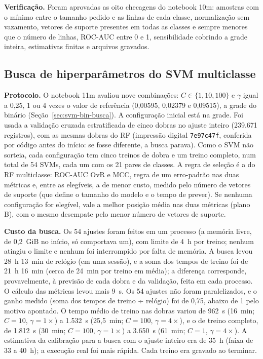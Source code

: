 \documentclass[
    12pt,                %
    openright,           %
    oneside,             %
    a4paper,             %
    english,             %
    brazil               %
]{abntex2}
\begin{document}
\textbf{Verificação.} Foram aprovadas as oito checagens do notebook 10m: amostras com o mínimo entre o tamanho pedido e as linhas de cada classe, normalização sem vazamento, vetores de suporte presentes em todas as classes e sempre menores que o número de linhas, ROC-AUC entre 0 e 1, sensibilidade cobrindo a grade inteira, estimativas finitas e arquivos gravados.
 
 
\subsection{Busca de hiperparâmetros do SVM multiclasse}
\label{sec:svm-multi-busca}
 
\textbf{Protocolo.} O notebook 11m avaliou nove combinações: $C \in \{1, 10, 100\}$ e $\gamma$ igual a 0,25, 1 ou 4 vezes o valor de referência (0,00595, 0,02379 e 0,09515), a grade do binário (Seção~\ref{sec:svm-bin-busca}). A configuração inicial está na grade. Foi usada a validação cruzada estratificada de cinco dobras no ajuste inteiro (239.671 registros), com as mesmas dobras do RF (impressão digital \texttt{7e97c47f}, conferida por código antes do início: se fosse diferente, a busca parava). Como o SVM não sorteia, cada configuração tem cinco treinos de dobra e um treino completo, num total de 54 SVMs, cada um com os 21 pares de classes. A regra de seleção é a do RF multiclasse: ROC-AUC OvR e MCC, regra de um erro-padrão nas duas métricas e, entre as elegíveis, a de menor custo, medido pelo número de vetores de suporte (que define o tamanho do modelo e o tempo de prever). Se nenhuma configuração for elegível, vale a melhor posição média nas duas métricas (plano B), com o mesmo desempate pelo menor número de vetores de suporte.
 
\textbf{Custo da busca.} Os 54 ajustes foram feitos em um processo (a memória livre, de 0,2~GiB no início, só comportava um), com limite de 4~h por treino; nenhum atingiu o limite e nenhum foi interrompido por falta de memória. A busca levou 28~h 13~min de relógio (em uma sessão), e a soma dos tempos de treino foi de 21~h 16~min (cerca de 24~min por treino em média); a diferença corresponde, provavelmente, à previsão de cada dobra e da validação, feita em cada processo. O cálculo das métricas levou mais 9~s. Os 54 ajustes não foram paralelizados, e o ganho medido (soma dos tempos de treino $\div$ relógio) foi de 0,75, abaixo de 1 pelo motivo apontado. O tempo médio de treino nas dobras variou de 962~s (16~min; $C = 10$, $\gamma = 1\times$) a 1.532~s (25,5~min; $C = 100$, $\gamma = 4\times$), e o de treino completo, de 1.812~s (30~min; $C = 100$, $\gamma = 1\times$) a 3.650~s (61~min; $C = 1$, $\gamma = 4\times$). A estimativa da calibração para a busca com o ajuste inteiro era de 35~h (faixa de 33 a 40~h); a execução real foi mais rápida. Cada treino era gravado ao terminar.
 
\end{document}
